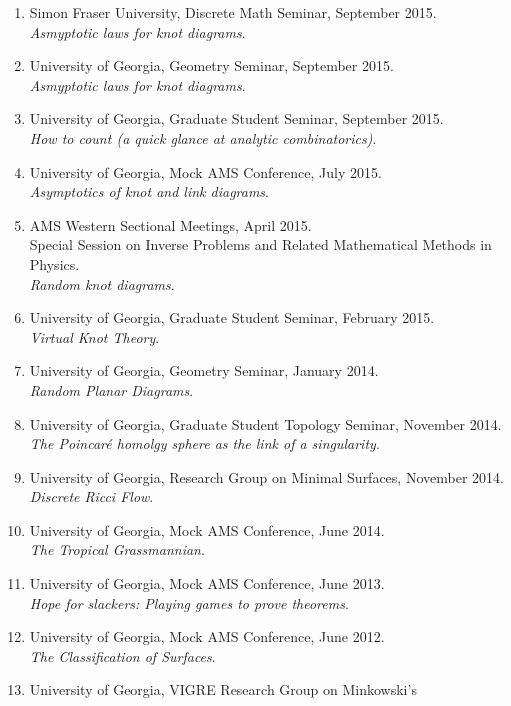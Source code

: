 \documentclass[letterpaper]{article}
\begin{document}
\begin{enumerate}
\item Simon Fraser University, Discrete Math Seminar, September 2015.\\
  \textit{Asmyptotic laws for knot diagrams}.
\item University of Georgia, Geometry Seminar, September 2015.\\
  \textit{Asmyptotic laws for knot diagrams}.
\item University of Georgia, Graduate Student Seminar, September 2015.\\
  \textit{How to count (a quick glance at analytic combinatorics)}.
\item University of Georgia, Mock AMS Conference, July 2015.\\
  \textit{Asymptotics of knot and link diagrams}.
\item AMS Western Sectional Meetings, April 2015.\\
  Special Session on Inverse Problems and Related Mathematical Methods in Physics. \\
  \textit{Random knot diagrams}.
\item University of Georgia, Graduate Student Seminar, February
  2015.\\
  \textit{Virtual Knot Theory}.
\item University of Georgia, Geometry Seminar, January 2014.\\
  \textit{Random Planar Diagrams}.
\item University of Georgia, Graduate Student Topology Seminar,
  November 2014.\\
  \textit{The Poincar\'e homolgy sphere as the link of a singularity}.
\item University of Georgia, Research Group on
  Minimal Surfaces, November 2014.\\
  \textit{Discrete Ricci Flow}.
\item University of Georgia, Mock AMS Conference, June 2014.\\
  \textit{The Tropical Grassmannian}.
\item University of Georgia, Mock AMS Conference, June 2013.\\
  \textit{Hope for slackers: Playing games to prove theorems}.
\item University of Georgia, Mock AMS Conference, June 2012.\\
  \textit{The Classification of Surfaces}.
\item University of Georgia, VIGRE Research Group on Minkowski's

\end{enumerate}
\end{document}
